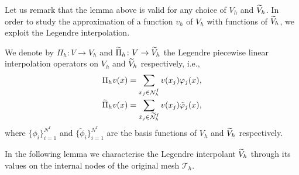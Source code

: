 \documentclass[10pt]{article}
\begin{document}
Let us remark that the lemma above is valid for any choice of $V_h$ and $\widetilde V_h$. In order to study the approximation of a function $v_h$ of $V_h$ with functions of $\widetilde V_h$, we exploit the Legendre interpolation.

\begin{definition} We denote by $\Pi_h\colon V \to V_h$ and $\widetilde \Pi_h\colon V \to \widetilde V_h$ the Legendre piecewise linear interpolation operators on $V_h$ and $\widetilde V_h$ respectively, i.e.,
	\begin{equation}
	\begin{aligned}
		\Pi_h v(x) = \fsum{x_j \in \mathcal N_h^I} v(x_j) \phi_j(x),\\
		\btilde \Pi_h v(x) = \fsum{\tilde x_j \in \btilde {\mathcal N}_h^I} v(x_j) \tilde \phi_j(x),
	\end{aligned}
	\end{equation}
	where $\{\phi_i\}_{i=1}^{N^I}$ and $\{\tilde \phi_i\}_{i=1}^{N^I}$ are the basis functions of $V_h$ and $\widetilde V_h$ respectively.
\end{definition}

In the following lemma we characterise the Legendre interpolant $\widetilde V_h$ through its values on the internal nodes of the original mesh $\mathcal T_h$.  
\end{document}
